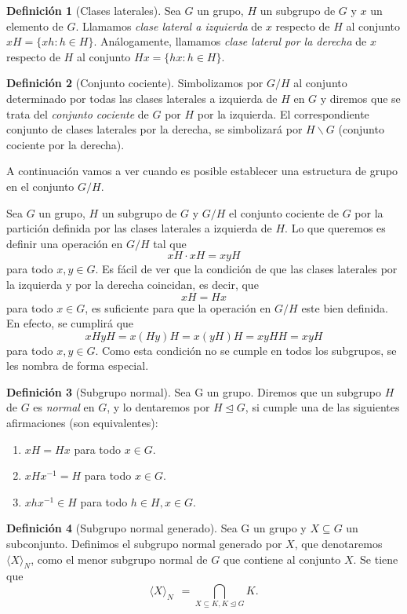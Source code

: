 \documentclass[12pt]{book}
\theoremstyle{definition}
\newtheorem{defi}{Definición}[section]
\begin{document}
\begin{defi}[Clases laterales]
Sea $G$ un grupo, $H$ un subgrupo de $G$ y $x$ un elemento de $G$. Llamamos \textit{clase lateral a izquierda} de $x$ respecto de $H$ al conjunto $xH=\{xh:h\in H\}$. Análogamente, llamamos \textit{clase lateral por la derecha} de $x$ respecto de $H$ al conjunto $Hx=\{hx:h\in H\}$.
\end{defi}

\begin{defi}[Conjunto cociente]
Simbolizamos por $G/H$ al conjunto determinado por todas las clases laterales a izquierda de $H$ en $G$ y diremos que se trata del \textit{conjunto cociente} de $G$ por $H$ por la izquierda. El correspondiente conjunto de clases laterales por la derecha, se simbolizará por $H\backslash G$ (conjunto cociente por la derecha).
\end{defi}

A continuación vamos a ver cuando es posible establecer una estructura de grupo en el conjunto $G/H$.

Sea $G$ un grupo, $H$ un subgrupo de $G$ y $G/H$ el conjunto cociente de $G$ por la partición definida por las clases laterales a izquierda de $H$. Lo que queremos es definir una operación en $G/H$ tal que
$$xH\cdot xH=xyH$$
para todo $x,y\in G$. Es fácil de ver que la condición de que las clases laterales por la izquierda y por la derecha coincidan, es decir, que
$$xH=Hx$$
para todo $x\in G$, es suficiente para que la operación en $G/H$ este bien definida. En efecto, se cumplirá que
$$xHyH=x(Hy)H=x(yH)H=xyHH=xyH$$
para todo $x,y\in G$. Como esta condición no se cumple en todos los subgrupos, se les nombra de forma especial.

\begin{defi}[Subgrupo normal]
Sea G un grupo. Diremos que un subgrupo $H$ de $G$ es \textit{normal} en $G$, y lo dentaremos por $H\unlhd G$, si cumple una de las siguientes afirmaciones (son equivalentes):
\begin{enumerate}
\item $xH=Hx$ para todo $x\in G$.
\item $xHx^{-1}=H$ para todo $x\in G$.
\item $xhx^{-1}\in H$ para todo $h\in H, x\in G$.
\end{enumerate}
\end{defi}

\begin{defi}[Subgrupo normal generado]
Sea G un grupo y $X\subseteq G$ un subconjunto. Definimos el subgrupo normal generado por $X$, que denotaremos $\langle X\rangle_N$, como el menor subgrupo normal de $G$ que contiene al conjunto $X$. Se tiene que
$$\langle X\rangle_N\ \ =\bigcap_{X\subseteq K, K\unlhd G}K.$$
\end{defi}
\end{document}
